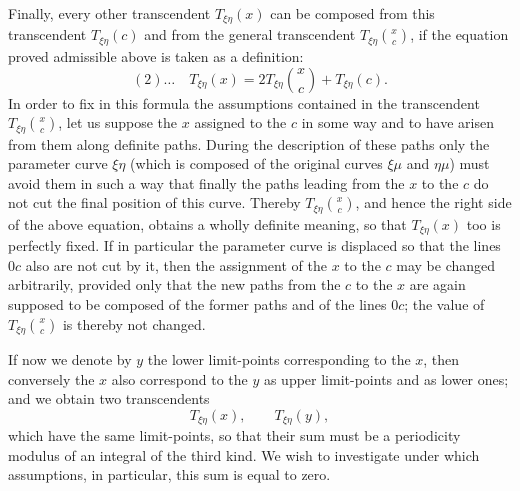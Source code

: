 \documentclass[10pt]{article}
\begin{document}
Finally, every other transcendent \(T_{\xi\eta}(x)\) can be composed from this transcendent \(T_{\xi\eta}(c)\) and from the general transcendent \(T_{\xi\eta}\binom{x}{c}\), if the equation proved admissible above is taken as a definition:
\[
(2)\ldots\quad T_{\xi\eta}(x)=2T_{\xi\eta}\binom{x}{c}+T_{\xi\eta}(c).
\]
In order to fix in this formula the assumptions contained in the transcendent \(T_{\xi\eta}\binom{x}{c}\), let us suppose the \(x\) assigned to the \(c\) in some way and to have arisen from them along definite paths. During the description of these paths only the parameter curve \(\xi\eta\) (which is composed of the original curves \(\xi\mu\) and \(\eta\mu\)) must avoid them in such a way that finally the paths leading from the \(x\) to the \(c\) do not cut the final position of this curve. Thereby \(T_{\xi\eta}\binom{x}{c}\), and hence the right side of the above equation, obtains a wholly definite meaning, so that \(T_{\xi\eta}(x)\) too is perfectly fixed. If in particular the parameter curve is displaced so that the lines \(0c\) also are not cut by it, then the assignment of the \(x\) to the \(c\) may be changed arbitrarily, provided only that the new paths from the \(c\) to the \(x\) are again supposed to be composed of the former paths and of the lines \(0c\); the value of \(T_{\xi\eta}\binom{x}{c}\) is thereby not changed.

If now we denote by \(y\) the lower limit-points corresponding to the \(x\), then conversely the \(x\) also correspond to the \(y\) as upper limit-points and as lower ones; and we obtain two transcendents
\[
T_{\xi\eta}(x),\qquad T_{\xi\eta}(y),
\]
which have the same limit-points, so that their sum must be a periodicity modulus of an integral of the third kind. We wish to investigate under which assumptions, in particular, this sum is equal to zero.
\end{document}
